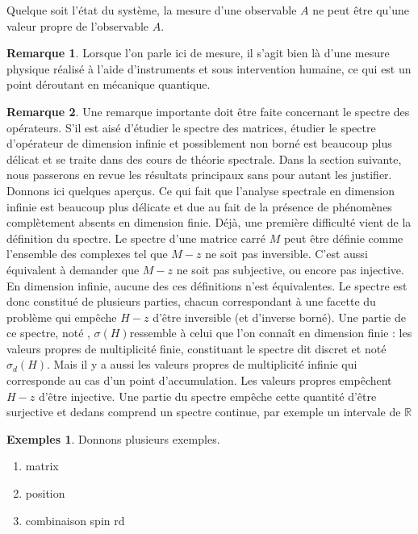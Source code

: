 \documentclass[12pt,openany,a4paper, titlepage]{article}
\newcommand{\R}{\mathbb{R}}
\theoremstyle{definition}
\theoremstyle{definition}
\theoremstyle{definition}
\theoremstyle{definition}
\newtheorem{exs}{Exemples}
\theoremstyle{definition}
\newtheorem{rem}{Remarque}
\theoremstyle{definition}
\begin{document}
\vspace{3mm}
\begin{tcolorbox}[colback=gray!5!white,
                  colframe=gray!80!white,
                  title= Postulat 3 : Principe de quantification ]
Quelque soit l'état du système, la mesure d'une observable $A$ ne peut être qu'une valeur propre de l'observable $A$.
\end{tcolorbox}
\vspace{3mm}

\begin{rem}
    Lorsque l'on parle ici de mesure, il s'agit bien là d'une mesure physique réalisé à l'aide d'instruments et sous intervention humaine, ce qui est un point déroutant en mécanique quantique. 
\end{rem}

\begin{rem}
    Une remarque importante doit être faite concernant le spectre des opérateurs. S'il est aisé d'étudier le spectre des matrices, étudier le spectre d'opérateur de dimension infinie et possiblement non borné est beaucoup plus délicat et se traite dans des cours de théorie spectrale. Dans la section suivante, nous passerons en revue les résultats principaux sans pour autant les justifier. Donnons ici quelques aperçus. Ce qui fait que l'analyse spectrale en dimension infinie est beaucoup plus délicate et due au fait de la présence de phénomènes complètement absents en dimension finie. Déjà, une première difficulté vient de la définition du spectre. Le spectre d'une matrice carré $M$ peut être définie comme l'ensemble des complexes tel que $M-z$ ne soit pas inversible. C'est aussi équivalent à demander que $M-z$ ne soit pas subjective, ou encore pas injective. En dimension infinie, aucune des ces définitions n'est équivalentes. Le spectre est donc constitué de plusieurs parties, chacun correspondant à une facette du problème qui empêche $H-z$ d'être inversible (et d'inverse borné). Une partie de ce spectre, noté , $\sigma(H)$ressemble à celui que l'on connaît en dimension finie : les valeurs propres de multiplicité finie, constituant le spectre dit discret et noté $\sigma_d(H)$. Mais il y a aussi les valeurs propres de multiplicité infinie qui corresponde au cas d'un point d'accumulation. Les valeurs propres empêchent $H-z$ d'être injective. Une partie du spectre empêche cette quantité d'être surjective et dedans comprend un spectre continue, par exemple un intervale de $\R$
\end{rem}

\begin{exs}
    Donnons plusieurs exemples.
    \begin{enumerate}
        \item[1] matrix
        \item[2] position
        \item[3] combinaison spin rd 
    \end{enumerate}
\end{exs}
\end{document}
